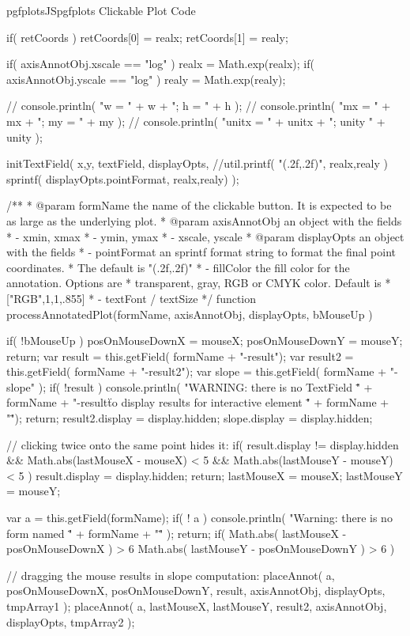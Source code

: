 {{\begin{insDLJS}[processAnnotatedPlot]{pgfplotsJS}{pgfplots Clickable Plot Code}
{	if( retCoords ) {
		retCoords[0] = realx;
		retCoords[1] = realy;
	}

	if( axisAnnotObj.xscale == "log" )
		realx = Math.exp(realx);
	if( axisAnnotObj.yscale == "log" )
		realy = Math.exp(realy);

//	console.println( "w = " + w + "; h = " + h );
//	console.println( "mx = " + mx + "; my = " + my );
//	console.println( "unitx = " + unitx + "; unity " + unity );

	initTextField( x,y, textField, displayOpts,
		//util.printf( "(\pgfplotsPERCENT.2f,\pgfplotsPERCENT.2f)", realx,realy )
		sprintf( displayOpts.pointFormat, realx,realy) );

}

/**
 * @param formName the name of the clickable button. It is expected to be as large as the underlying plot.
 * @param axisAnnotObj an object with the fields
 *   - xmin, xmax
 *   - ymin, ymax
 *   - xscale, yscale
 * @param displayOpts an object with the fields
 *   - pointFormat an sprintf format string to format the final point coordinates.
 *   The default is  "(\pgfplotsPERCENT.2f,\pgfplotsPERCENT.2f)"
 *   - fillColor the fill color for the annotation. Options are
 *    transparent, gray, RGB or CMYK color. Default is
 *       ["RGB",1,1,.855]
 *	 - textFont / textSize
 */
function processAnnotatedPlot(formName, axisAnnotObj, displayOpts, bMouseUp ) 
{
	if( !bMouseUp ) {
		posOnMouseDownX = mouseX;
		posOnMouseDownY = mouseY;
		return;
	}
	var result = this.getField( formName + "-result");
	var result2 = this.getField( formName + "-result2");
	var slope 	= this.getField( formName + "-slope" );
	if( !result ) {
		console.println( "WARNING: there is no TextField \"" + formName + "-result\" to display results for interactive element \"" + formName + "\"");
		return;
	}
	result2.display = display.hidden;
	slope.display = display.hidden;

	// clicking twice onto the same point hides it:
	if( result.display != display.hidden && 
		Math.abs(lastMouseX - mouseX) < 5 &&
		Math.abs(lastMouseY - mouseY) < 5 ) 
	{
		result.display = display.hidden;
		return;
	}
	lastMouseX = mouseX;
	lastMouseY = mouseY;

	var a = this.getField(formName);
	if( ! a ) {
		console.println( "Warning: there is no form named \"" + formName + "\"" );
		return;
	}
	if( Math.abs( lastMouseX - posOnMouseDownX ) > 6 \pgfplotsVERTBAR\pgfplotsVERTBAR
		Math.abs( lastMouseY - posOnMouseDownY ) > 6 )
	{
		// dragging the mouse results in slope computation:
		placeAnnot( a, posOnMouseDownX, posOnMouseDownY, result, axisAnnotObj, displayOpts, tmpArray1 );
		placeAnnot( a, lastMouseX, lastMouseY, result2, axisAnnotObj, displayOpts, tmpArray2 );

}}
\end{insDLJS}}}
